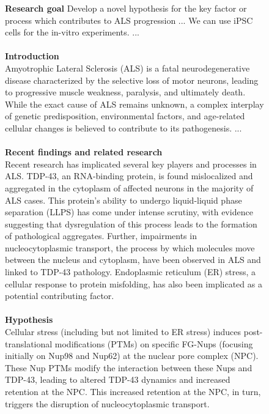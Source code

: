 \begin{figure}[htbp!]
\begin{tcolorbox}[
    colback=black!5!white,
    colframe=black!60!white,
    title=\textbf{Example output of the Generation agent},
    fonttitle=\bfseries,
    arc=3mm,
    boxrule=1pt,
    bottomrule=2pt,
]
\footnotesize
\textbf{Research goal} Develop a novel hypothesis for the key factor or process which contributes to ALS progression ... We can use iPSC cells for the in-vitro experiments. ...
\\
\\
\textbf{Introduction}
\\
Amyotrophic Lateral Sclerosis (ALS) is a fatal neurodegenerative disease characterized by the selective loss of motor neurons, leading to progressive muscle weakness, paralysis, and ultimately death. While the exact cause of ALS remains unknown, a complex interplay of genetic predisposition, environmental factors, and age-related cellular changes is believed to contribute to its pathogenesis. ...
\\
\\
\textbf{Recent findings and related research}
\\
Recent research has implicated several key players and processes in ALS. TDP-43, an RNA-binding protein, is found mislocalized and aggregated in the cytoplasm of affected neurons in the majority of ALS cases. This protein's ability to undergo liquid-liquid phase separation (LLPS) has come under intense scrutiny, with evidence suggesting that dysregulation of this process leads to the formation of pathological aggregates. Further, impairments in nucleocytoplasmic transport, the process by which molecules move between the nucleus and cytoplasm, have been observed in ALS and linked to TDP-43 pathology. Endoplasmic reticulum (ER) stress, a cellular response to protein misfolding, has also been implicated as a potential contributing factor.
\\
\\
\textbf{Hypothesis}
\\
Cellular stress (including but not limited to ER stress) induces post-translational modifications (PTMs) on specific FG-Nups (focusing initially on Nup98 and Nup62) at the nuclear pore complex (NPC). These Nup PTMs modify the interaction between these Nups and TDP-43, leading to altered TDP-43 dynamics and increased retention at the NPC. This increased retention at the NPC, in turn, triggers the disruption of nucleocytoplasmic transport.
\\

\end{tcolorbox}
\end{figure}
